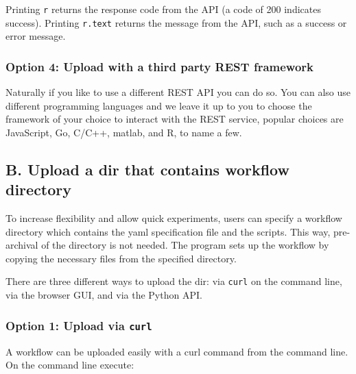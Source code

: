Printing \texttt{r} returns the response code from the API (a code of
200 indicates success). Printing \texttt{r.text} returns the message
from the API, such as a success or error message.

\subsubsection{Option 4: Upload with a third party REST
framework}\label{option-4-upload-with-a-third-party-rest-framework}

Naturally if you like to use a different REST API you can do so. You can
also use different programming languages and we leave it up to you to
choose the framework of your choice to interact with the REST service,
popular choices are JavaScript, Go, C/C++, matlab, and R, to name a few.

\subsection{B. Upload a dir that contains workflow
directory}\label{b.-upload-a-dir-that-contains-workflow-directory}

To increase flexibility and allow quick experiments, users can specify a
workflow directory which contains the yaml specification file and the
scripts. This way, pre-archival of the directory is not needed. The
program sets up the workflow by copying the necessary files from the
specified directory.

There are three different ways to upload the dir: via \texttt{curl} on
the command line, via the browser GUI, and via the Python API.

\subsubsection{\texorpdfstring{Option 1: Upload via
\texttt{curl}}{Option 1: Upload via curl}}\label{option-1-upload-via-curl-1}

A workflow can be uploaded easily with a curl command from the command
line. On the command line execute:

\begin{Shaded}
\begin{Highlighting}[]
   \DataTypeTok{\textbackslash{}}
   \DataTypeTok{\textbackslash{}}
    \DataTypeTok{\textbackslash{}}
   \StringTok{\textquotesingle{}\textquotesingle{}}
\end{Highlighting}
\end{Shaded}

